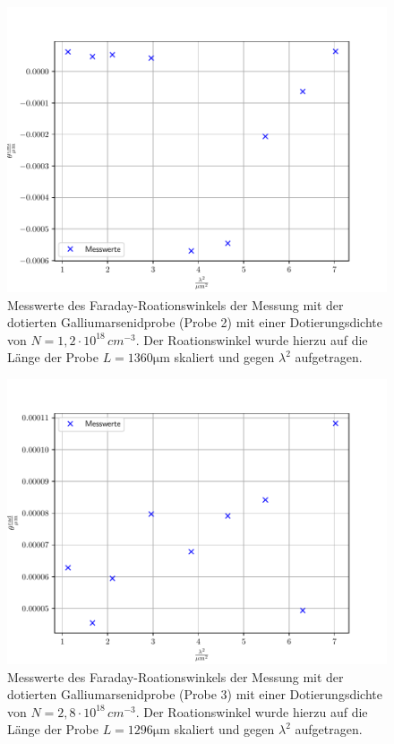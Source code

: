 \noindent
\FloatBarrier
\begin{figure}[h]
    \centering
    \includegraphics[width=1\textwidth]{Winkel_n-dotiert_1.pdf}
    \caption{Messwerte des Faraday-Roationswinkels der Messung mit der dotierten Galliumarsenidprobe (Probe 2) mit einer Dotierungsdichte von $N=1,2\cdot 10^{18}\, \si{cm}^{-3}$. Der Roationswinkel wurde hierzu auf die Länge der Probe $L = 1360 \si{\micro\meter}$ skaliert und gegen $\lambda ^2$ aufgetragen.}
    \label{fig:afig3}
\end{figure}
\FloatBarrier
\noindent

\noindent
\FloatBarrier
\begin{figure}[h]
    \centering
    \includegraphics[width=1\textwidth]{Winkel_n-dotiert_2.pdf}
    \caption{Messwerte des Faraday-Roationswinkels der Messung mit der dotierten Galliumarsenidprobe (Probe 3) mit einer Dotierungsdichte von $N=2,8\cdot 10^{18}\, \si{cm}^{-3}$. Der Roationswinkel wurde hierzu auf die Länge der Probe $L = 1296 \si{\micro\meter}$ skaliert und gegen $\lambda ^2$ aufgetragen.}
    \label{fig:afig4}
\end{figure}
\FloatBarrier
\noindent

